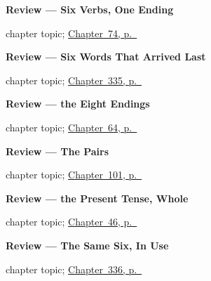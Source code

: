 \noindent\begin{minipage}[t]{\linewidth}
\raggedright
\textbf{Review --- Six Verbs, One Ending}\par
\footnotesize chapter topic; \hyperref[ch:spanish-review-yo-go]{Chapter~74, p.~\pageref*{ch:spanish-review-yo-go}}
\end{minipage}\par\smallskip

\noindent\begin{minipage}[t]{\linewidth}
\raggedright
\textbf{Review --- Six Words That Arrived Last}\par
\footnotesize chapter topic; \hyperref[ch:repaso-seis-palabras]{Chapter~335, p.~\pageref*{ch:repaso-seis-palabras}}
\end{minipage}\par\smallskip

\noindent\begin{minipage}[t]{\linewidth}
\raggedright
\textbf{Review --- the Eight Endings}\par
\footnotesize chapter topic; \hyperref[ch:repaso-ocho]{Chapter~64, p.~\pageref*{ch:repaso-ocho}}
\end{minipage}\par\smallskip

\noindent\begin{minipage}[t]{\linewidth}
\raggedright
\textbf{Review --- The Pairs}\par
\footnotesize chapter topic; \hyperref[ch:review-double-object]{Chapter~101, p.~\pageref*{ch:review-double-object}}
\end{minipage}\par\smallskip

\noindent\begin{minipage}[t]{\linewidth}
\raggedright
\textbf{Review --- the Present Tense, Whole}\par
\footnotesize chapter topic; \hyperref[ch:spanish-review-present-all]{Chapter~46, p.~\pageref*{ch:spanish-review-present-all}}
\end{minipage}\par\smallskip

\noindent\begin{minipage}[t]{\linewidth}
\raggedright
\textbf{Review --- The Same Six, In Use}\par
\footnotesize chapter topic; \hyperref[ch:repaso-seis-en-uso]{Chapter~336, p.~\pageref*{ch:repaso-seis-en-uso}}
\end{minipage}\par\smallskip

